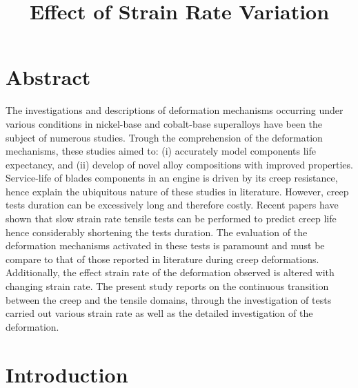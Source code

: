 \documentclass[a4paper,12pt,times,numbered,print,index]{Classes/PhDThesisPSnPDF}
\title{Effect of Strain Rate Variation}
\begin{document}
\section*{Abstract}
The investigations and descriptions of deformation mechanisms occurring under various conditions in nickel-base and cobalt-base superalloys have been the subject of numerous studies. Trough the comprehension of the deformation mechanisms, these studies aimed to: (i) accurately model components life expectancy, and (ii) develop of novel alloy compositions with improved properties. Service-life of blades components in an engine is driven by its creep resistance, hence explain the ubiquitous nature of these studies in literature. However, creep tests duration can be excessively long and therefore costly. Recent papers have shown that slow strain rate tensile tests can be performed to predict creep life hence considerably shortening the tests duration. The evaluation of the deformation mechanisms activated in these tests is paramount and must be compare to that of those reported in literature during creep deformations. Additionally, the effect strain rate of the deformation observed is altered with changing strain rate. 
The present study reports on the continuous transition between the creep and the tensile domains, through the investigation of tests carried out various strain rate as well as the detailed investigation of the deformation. 




\linenumbers

\section*{Introduction}
\label{S:1}
\end{document}
